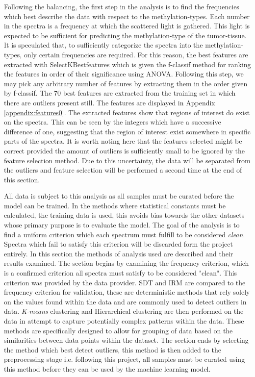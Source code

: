 Following the balancing, the first step in the analysis is to find the frequencies which best describe the data with respect to the methylation-types. Each number in the spectra is a frequency at which the scattered light is gathered. This light is expected to be sufficient for predicting the methylation-type of the tumor-tissue. It is speculated that, to sufficiently categorize the spectra into the methylation-types, only certain frequencies are required. For this reason, the best features are extracted with SelectKBestfeatures \cite{scikit} which is given the f-classif method for ranking the features in order of their significance using ANOVA. Following this step, we may pick any arbitrary number of features by extracting them in the order given by f-classif. The $70$ best features are extracted from the training set in which there are outliers present still. The features are displayed in Appendix \ref{appendix:features0}. The extracted features show that regions of interest do exist on the spectra. This can be seen by the integers which have a successive difference of one, suggesting that the region of interest exist somewhere in specific parts of the spectra. It is worth noting here that the features selected might be correct provided the amount of outliers is sufficiently small to be ignored by the feature selection method. Due to this uncertainty, the data will be separated from the outliers and feature selection will be performed a second time at the end of this section.

All data is subject to this analysis as all samples must be curated before the model can be trained. In the methods where statistical constants must be calculated, the training data is used, this avoids bias towards the other datasets whose primary purpose is to evaluate the model. The goal of the analysis is to find a uniform criterion which each spectrum must fulfill to be considered \textit{clean}. Spectra which fail to satisfy this criterion will be discarded form the project entirely. In this section the methods of analysis used are described and their results examined. The section begins by examining the frequency criterion, which is a confirmed criterion all spectra must satisfy to be considered "clean". This criterion was provided by the data provider. SDT and IRM are compared to the frequency criterion for validation, these are deterministic methods that rely solely on the values found within the data and are commonly used to detect outliers in data. \textit{K-means} clustering and Hierarchical clustering are then performed on the data in attempt to capture potentially complex patterns within the data. These methods are specifically designed to allow for grouping of data based on the similarities between data points within the dataset. The section ends by selecting the method which best detect outliers, this method is then added to the preprocessing stage i.e. following this project, all samples must be curated using this method before they can be used by the machine learning model. 


